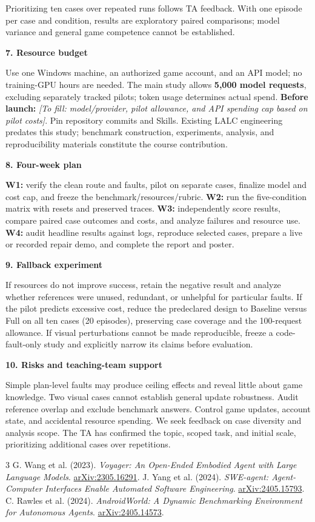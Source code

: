 \documentclass[10pt,a4paper]{article}
\newcommand{\topic}[1]{\par\medskip\textbf{#1}\par\smallskip}
\newcommand{\todo}[1]{\textit{[To fill: #1]}}
\begin{document}
Prioritizing ten cases over repeated runs follows TA feedback. With one episode
per case and condition, results are exploratory paired comparisons; model
variance and general game competence cannot be established.

\topic{7. Resource budget}
Use one Windows machine, an authorized game account, and an API model; no
training-GPU hours are needed. The main study allows \textbf{5,000 model requests},
excluding separately tracked pilots; token usage determines actual spend.
\textbf{Before launch:} \todo{model/provider, pilot allowance, and API spending cap
based on pilot costs}. Pin repository commits and Skills. Existing LALC
engineering predates this study; benchmark construction, experiments, analysis,
and reproducibility materials constitute the course contribution.

\topic{8. Four-week plan}
\textbf{W1:} verify the clean route and faults, pilot on separate cases, finalize
model and cost cap, and freeze the benchmark/resources/rubric.
\textbf{W2:} run the five-condition matrix with resets and preserved traces.
\textbf{W3:} independently score results, compare paired case outcomes and costs,
and analyze failures and resource use.
\textbf{W4:} audit headline results against logs, reproduce selected cases,
prepare a live or recorded repair demo, and complete the report and poster.

\topic{9. Fallback experiment}
If resources do not improve success, retain the negative result and analyze
whether references were unused, redundant, or unhelpful for particular faults.
If the pilot predicts excessive cost, reduce the predeclared design to Baseline
versus Full on all ten cases (20 episodes), preserving case coverage and the
100-request allowance. If visual perturbations cannot be made reproducible,
freeze a code-fault-only study and explicitly narrow its claims before evaluation.

\topic{10. Risks and teaching-team support}
Simple plan-level faults may produce ceiling effects and reveal little about
game knowledge. Two visual cases cannot establish general update robustness.
Audit reference overlap and exclude benchmark answers. Control game updates,
account state, and accidental resource spending. We seek feedback on case
diversity and analysis scope. The TA has confirmed the topic, scoped task, and
initial scale, prioritizing additional cases over repetitions.

\begingroup
\small
\setlength{\parskip}{0pt}
\begin{thebibliography}{3}
\setlength{\itemsep}{0pt}
 G. Wang et al. (2023).
\emph{Voyager: An Open-Ended Embodied Agent with Large Language Models}.
\href{https://arxiv.org/abs/2305.16291}{arXiv:2305.16291}.
 J. Yang et al. (2024).
\emph{SWE-agent: Agent-Computer Interfaces Enable Automated Software Engineering}.
\href{https://arxiv.org/abs/2405.15793}{arXiv:2405.15793}.
 C. Rawles et al. (2024).
\emph{AndroidWorld: A Dynamic Benchmarking Environment for Autonomous Agents}.
\href{https://arxiv.org/abs/2405.14573}{arXiv:2405.14573}.
\end{thebibliography}
\endgroup
\end{document}
